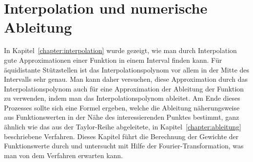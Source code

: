 %
%
%
\chapter{Interpolation und numerische Ableitung\label{chapter:interdiff}}
\rhead{}
\begin{refsection}
%
%
%

{\parindent0pt
In} Kapitel~\ref{chapter:interpolation} wurde gezeigt, wie man durch
Interpolation gute Approximationen einer Funktion in einem Interval
finden kann.
Für äquidistante Stützstellen ist das Interpolationspolynom vor allem in
der Mitte des Intervalls sehr genau.
Man kann daher versuchen, diese Approximation durch das Interpolationspolynom
auch für eine Approximation der Ableitung der Funktion zu verwenden, indem
man das Interpolationspolynom ableitet.
%
Am Ende dieses Prozesses sollte sich eine Formel ergeben, welche die
Ableitung näherungsweise aus Funktionswerten in der Nähe des
interessierenden Punktes bestimmt, ganz ähnlich wie das aus der
Taylor-Reihe abgeleitete, in Kapitel~\ref{chapter:ableitung} beschriebene
Verfahren.
%
Dieses Kapitel führt die Berechnung der Gewichte der Funktionswerte durch
und untersucht mit Hilfe der Fourier-Transformation, was man von dem Verfahren
erwarten kann.
%






\printbibliography[heading=subbibliography]
\end{refsection}
